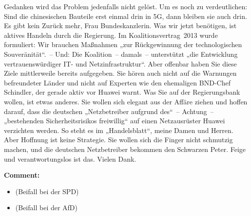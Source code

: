 \documentclass{article}
\begin{document}
Gedanken wird das Problem jedenfalls nicht gelöst.  Um es noch zu verdeutlichen: Sind die chinesischen Bauteile erst einmal drin in 5G, dann bleiben sie auch drin. Es gibt kein Zurück mehr, Frau Bundeskanzlerin. Was wir jetzt benötigen, ist aktives Handeln durch die Regierung. Im Koalitionsvertrag 2013 wurde formuliert: Wir brauchen Maßnahmen „zur Rückgewinnung der technologischen Souveränität“. – Und: Die Koalition – damals – unterstützt „die Entwicklung vertrauenswürdiger IT- und Netzinfrastruktur“. Aber offenbar haben Sie diese Ziele mittlerweile bereits aufgegeben. Sie hören auch nicht auf die Warnungen befreundeter Länder und nicht auf Experten wie den ehemaligen BND-Chef Schindler, der gerade aktiv vor Huawei warnt. Was Sie auf der Regierungsbank wollen, ist etwas anderes. Sie wollen sich elegant aus der Affäre ziehen und hoffen darauf, dass die deutschen „Netzbetreiber aufgrund des“ – Achtung – „bestehenden Sicherheitsrisikos freiwillig“ auf einen Netzausrüster Huawei verzichten werden. So steht es im „Handelsblatt“, meine Damen und Herren. Aber Hoffnung ist keine Strategie. Sie wollen sich die Finger nicht schmutzig machen, und die deutschen Netzbetreiber bekommen den Schwarzen Peter. Feige und verantwortungslos ist das. Vielen Dank.  

\noindent\textbf{Comment:}
\begin{itemize}
    \setlength\itemsep{-3pt}
    \item (Beifall bei der SPD)
    \setlength\itemsep{-3pt}
    \item (Beifall bei der AfD)
\end{itemize}
\end{document}
